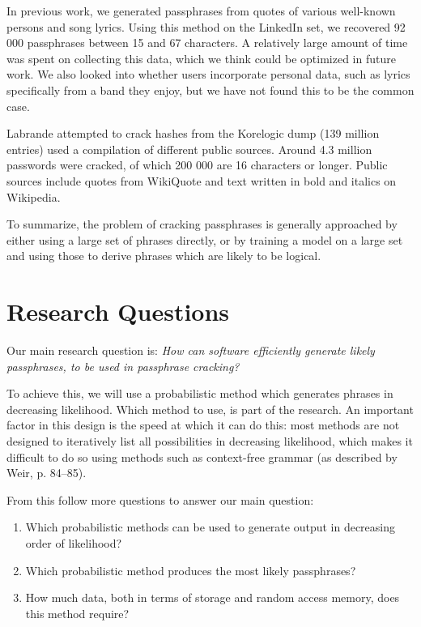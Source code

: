 \documentclass{article}
\begin{document}
In previous work, we\cite{own} generated passphrases from quotes of various
well-known persons and song lyrics. Using this method on the LinkedIn set, we
recovered 92 000 passphrases between 15 and 67 characters. A relatively large
amount of time was spent on collecting this data, which we think could be
optimized in future work. We also looked into whether users incorporate
personal data, such as lyrics specifically from a band they enjoy, but we have
not found this to be the common case.

Labrande\cite{crackmeimfamous} attempted to crack hashes from the Korelogic
dump (139 million entries) used a compilation of different public sources.
Around 4.3 million passwords were cracked, of which 200 000 are 16 characters
or longer. Public sources include quotes from WikiQuote and text written in
bold and italics on Wikipedia.

To summarize, the problem of cracking passphrases is generally approached by
either using a large set of phrases directly, or by training a model on a large
set and using those to derive phrases which are likely to be logical.


\section{Research Questions}

Our main research question is: {\it How can software efficiently generate
likely passphrases, to be used in passphrase cracking?}

To achieve this, we will use a probabilistic method which generates phrases in
decreasing likelihood. Which method to use, is part of the research. An
important factor in this design is the speed at which it can do this: most
methods are not designed to iteratively list all possibilities in decreasing
likelihood, which makes it difficult to do so using methods such as
context-free grammar (as described by Weir\cite{probabilistic-thesis}, p.
84--85).

From this follow more questions to answer our main question:

\begin{enumerate}
	\item Which probabilistic methods can be used to generate output in decreasing order of likelihood?
	\item Which probabilistic method produces the most likely passphrases?
	\item How much data, both in terms of storage and random access memory, does this method require?
\end{enumerate}
\end{document}
